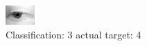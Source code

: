 \begin{figure}[h!]
\begin{center}
\includegraphics[width=0.60\columnwidth]{figures/ID2617_class_3_target_4.png}
\end{center}
\caption{ Classification: 3 actual target: 4}
\label{fig:ID2617_class_3_target_4}
\end{figure}

